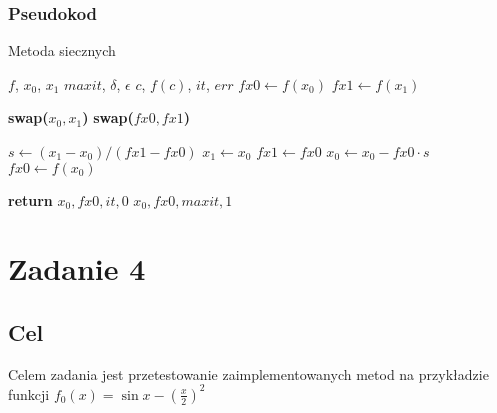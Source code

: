 \documentclass{article}
\begin{document}
\subsubsection{Pseudokod}
\begin{algorithm}[h!]
    \caption{Metoda siecznych}
    \begin{algorithmic}[1]
        \Require $f$,  \newline
        $x_0$, $x_1$  \newline
        $maxit$,  \newline
        $\delta$, $\epsilon$    
        \Ensure $c$,  \newline
         $f(c)$, 
         $it$,  \newline
         $err$ 
            \State $fx0 \gets f(x_0)$
            \State $fx1 \gets f(x_1)$

                    \State \textbf{swap(}$x_0, x_1$\textbf{)} 
                    \State \textbf{swap(}$fx0, fx1$\textbf{)} 
                \EndIf

                \State $s \gets (x_1 - x_0) / (fx1 - fx0)$
                \State $x_1 \gets x_0$
                \State $fx1 \gets fx0$
                \State $x_0 \gets x_0 - fx0 \cdot s$
                \State $fx0 \gets f(x_0)$
                
                    \State \textbf{return} $x_0, fx0, it, 0$
                \EndIf
            \EndFor
            \State \Return $x_0, fx0, maxit, 1$ 
        \EndFunction
    \end{algorithmic}
\end{algorithm}

\section{Zadanie 4}
\subsection{Cel}
Celem zadania jest przetestowanie zaimplementowanych metod na przykładzie funkcji $f_0(x) = \sin{x} - (\frac{x}{2})^2$
\end{document}
